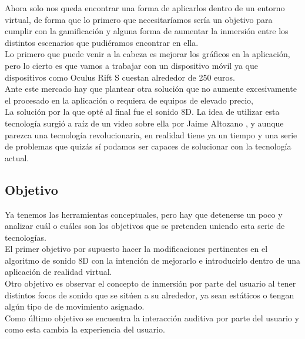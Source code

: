 \quad Ahora solo nos queda encontrar una forma de aplicarlos dentro de un entorno virtual, de forma que lo primero que necesitaríamos sería un objetivo para cumplir con la gamificación y alguna forma de aumentar la inmersión entre los distintos escenarios que pudiéramos encontrar en ella.\\

\quad Lo primero que puede venir a la cabeza es mejorar los gráficos en la aplicación, pero lo cierto es que vamos a trabajar con un dispositivo móvil ya que dispositivos como Oculus Rift S cuestan alrededor de 250 euros\cite{OcuRS}.\\

\quad Ante este mercado hay que plantear otra solución que no aumente excesivamente el procesado en la aplicación o requiera de equipos de elevado precio,\\

\quad La solución por la que opté al final fue el sonido 8D. La idea de utilizar esta tecnología surgió a raíz de un video sobre ella por Jaime Altozano \cite{JAlto}, y aunque parezca una tecnología revolucionaria, en realidad tiene ya un tiempo y una serie de problemas \cite{8D} que quizás sí podamos ser capaces de solucionar con la tecnología actual.

\subsection{Objetivo}
\quad Ya tenemos las herramientas conceptuales, pero hay que detenerse un poco y analizar cuál o cuáles son los objetivos que se pretenden uniendo esta serie de tecnologías.\\

\quad El primer objetivo por supuesto hacer la modificaciones pertinentes en el algoritmo de sonido 8D con la intención de mejorarlo e introducirlo dentro de una aplicación de realidad virtual.\\

\quad Otro objetivo es observar el concepto de inmersión por parte del usuario al tener distintos focos de sonido que se sitúen a su alrededor, ya sean estáticos o tengan algún tipo de de movimiento asignado.\\

\quad Como último objetivo se encuentra la interacción auditiva por parte del usuario y como esta cambia la experiencia del usuario.\\

\newpage






